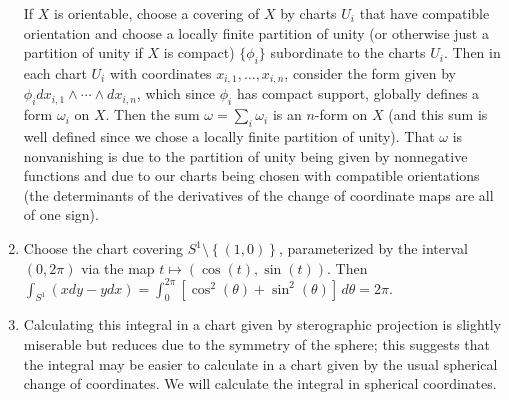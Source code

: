 \documentclass[11pt,leqno]{article}
\theoremstyle{plain}
\theoremstyle{definition}
\numberwithin{equation}{section}
\numberwithin{lem}{section}
\newcommand{\cbr}[1]{\left\{#1\right\}}
\begin{document}
\begin{enumerate}
    If $X$ is orientable, choose a covering of $X$ by charts $U_i$ that have compatible orientation and choose a locally finite partition of unity (or otherwise just a partition of unity if $X$ is compact) $\{\phi_i\}$ subordinate to the charts $U_i$. Then in each chart $U_i$ with coordinates $x_{i,1},\dots,x_{i,n}$, consider the form given by $\phi_idx_{i,1}\wedge\cdots\wedge dx_{i,n}$, which since $\phi_i$ has compact support, globally defines a form $\omega_i$ on $X$. Then the sum $\omega = \sum_i\omega_i$ is an $n$-form on $X$ (and this sum is well defined since we chose a locally finite partition of unity). That $\omega$ is nonvanishing is due to the partition of unity being given by nonnegative functions and due to our charts being chosen with compatible orientations (the determinants of the derivatives of the change of coordinate maps are all of one sign).
    \item Choose the chart covering $S^1\setminus\cbr{(1,0)}$, parameterized by the interval $(0,2\pi)$ via the map $t\mapsto (\cos(t),\sin(t))$. Then $\int_{S^1}(xdy-ydx) = \int_0^{2\pi}[\cos^2(\theta) + \sin^2(\theta)]\,d\theta = 2\pi$.
    \item Calculating this integral in a chart given by sterographic projection is slightly miserable but reduces due to the symmetry of the sphere; this suggests that the integral may be easier to calculate in a chart given by the usual spherical change of coordinates. We will calculate the integral in spherical coordinates.
    


\end{enumerate}
\end{document}
